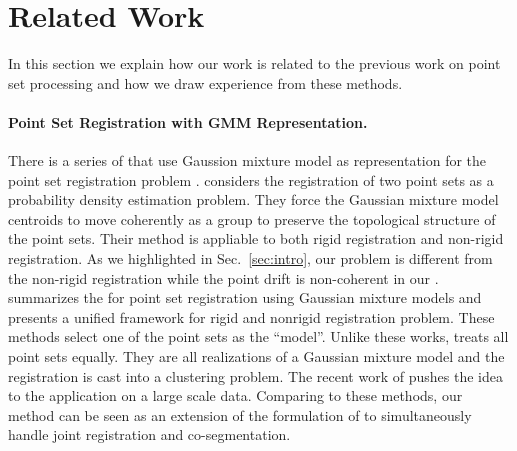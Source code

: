 \section{Related Work}
\label{sec:rw}
In this section we explain how our work is related to the previous work on point set processing and how we draw experience from these methods.


\paragraph{Point Set Registration with GMM Representation.}
There is a series of  that use Gaussion  mixture model as  representation for the point set registration problem .
%
\cite{CPD} considers the registration of two point sets as a probability density estimation problem. 
They force the Gaussian mixture model centroids to move coherently as a group to preserve the topological structure of the point sets. Their method is appliable  to both rigid registration and non-rigid registration. 
%
As we highlighted in Sec.~\ref{sec:intro}, our problem is different from the non-rigid registration while the point drift is non-coherent in our .
%
\cite{GMM_PAMI} summarizes the  for point set registration using Gaussian mixture models and presents a unified framework for rigid and nonrigid registration problem. 
%
These methods select one of the point sets as the ``model''.  
%
Unlike these works, \cite{Evangelidis2014} treats all point sets equally.
They are all realizations of a Gaussian mixture model and the registration is cast into a clustering problem. 
The recent work of \cite{GOGMA} pushes the idea to the application on a large scale data. 
Comparing to these methods, our method can be seen as an extension of the formulation of \cite{Evangelidis2014} to simultaneously handle joint registration and co-segmentation. 
 



